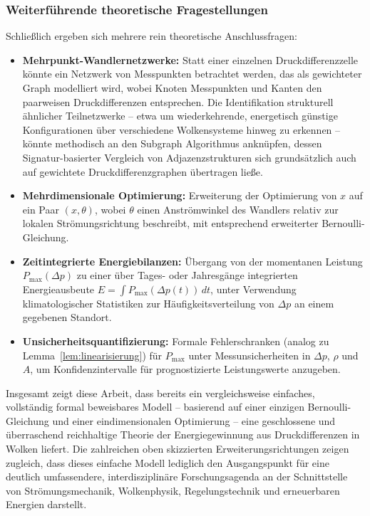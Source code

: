 ﻿\documentclass[a4paper,12pt]{article}
\theoremstyle{definition}
\begin{document}
\subsubsection{Weiterführende theoretische Fragestellungen}

Schließlich ergeben sich mehrere rein theoretische Anschlussfragen:

\begin{itemize}
	\item \textbf{Mehrpunkt-Wandlernetzwerke:} Statt einer einzelnen
	Druckdifferenzzelle könnte ein Netzwerk von Messpunkten betrachtet
	werden, das als gewichteter Graph modelliert wird, wobei Knoten
	Messpunkten und Kanten den paarweisen Druckdifferenzen entsprechen.
	Die Identifikation strukturell ähnlicher Teilnetzwerke -- etwa um
	wiederkehrende, energetisch günstige Konfigurationen über
	verschiedene Wolkensysteme hinweg zu erkennen -- könnte
	methodisch an den Subgraph Algorithmus anknüpfen, dessen
	Signatur-basierter Vergleich von Adjazenzstrukturen sich
	grundsätzlich auch auf gewichtete Druckdifferenzgraphen übertragen
	ließe.
	\item \textbf{Mehrdimensionale Optimierung:} Erweiterung der
	Optimierung von $x$ auf ein Paar $(x, \theta)$, wobei $\theta$ einen
	Anströmwinkel des Wandlers relativ zur lokalen Strömungsrichtung
	beschreibt, mit entsprechend erweiterter Bernoulli-Gleichung.
	\item \textbf{Zeitintegrierte Energiebilanzen:} Übergang von der
	momentanen Leistung $P_{\max}(\Delta p)$ zu einer über Tages- oder
	Jahresgänge integrierten Energieausbeute $E = \int P_{\max}(\Delta
	p(t))\,dt$, unter Verwendung klimatologischer Statistiken zur
	Häufigkeitsverteilung von $\Delta p$ an einem gegebenen Standort.
	\item \textbf{Unsicherheitsquantifizierung:} Formale Fehlerschranken
	(analog zu Lemma~\ref{lem:linearisierung}) für $P_{\max}$ unter
	Messunsicherheiten in $\Delta p$, $\rho$ und $A$, um Konfidenzintervalle
	für prognostizierte Leistungswerte anzugeben.
\end{itemize}

Insgesamt zeigt diese Arbeit, dass bereits ein vergleichsweise einfaches,
vollständig formal beweisbares Modell -- basierend auf einer einzigen
Bernoulli-Gleichung und einer eindimensionalen Optimierung -- eine
geschlossene und überraschend reichhaltige Theorie der Energiegewinnung
aus Druckdifferenzen in Wolken liefert. Die zahlreichen oben skizzierten
Erweiterungsrichtungen zeigen zugleich, dass dieses einfache Modell
lediglich den Ausgangspunkt für eine deutlich umfassendere, interdisziplinäre
Forschungsagenda an der Schnittstelle von Strömungsmechanik,
Wolkenphysik, Regelungstechnik und erneuerbaren Energien darstellt.
\end{document}
